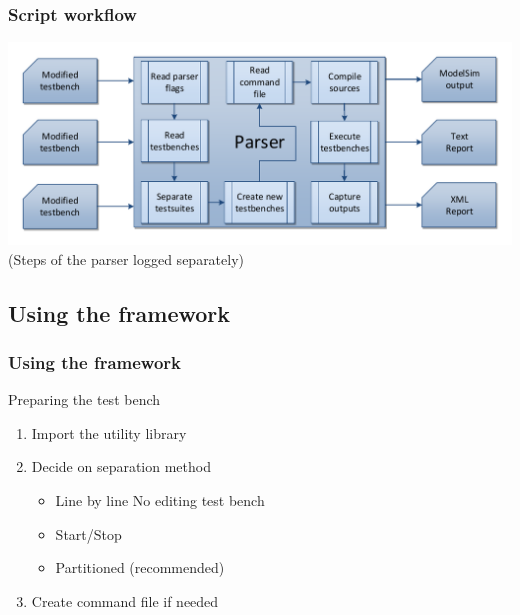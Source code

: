 \documentclass[british,10pt]{beamer}
\begin{document}
\begin{frame}\frametitle{Script workflow}
\includegraphics[width=\textwidth]{images/parserwork.pdf}
\newline{}
\centering(Steps of the parser logged separately)
\end{frame}


\subsection{Using the framework}

\begin{frame}\frametitle{Using the framework}
Preparing the test bench
\begin{enumerate}
\item Import the utility library
\item Decide on separation method
\begin{itemize}
\item Line by line  No editing test bench
\item Start/Stop
\item Partitioned (recommended)
\end{itemize}
\item Create command file if needed
\end{enumerate}
\end{frame}
\end{document}
